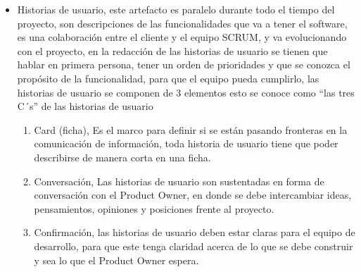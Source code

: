 \begin{itemize}
     \item Historias de usuario, este artefacto es paralelo durante todo el tiempo del proyecto, son descripciones de las funcionalidades que va a tener el software, es una colaboración entre el cliente y el equipo SCRUM, y va evolucionando con el proyecto, en la redacción de las historias de usuario se tienen que hablar en primera persona, tener un orden de prioridades y que se conozca el propósito de la funcionalidad, para que el equipo pueda cumplirlo, las historias de usuario se componen de 3 elementos esto se conoce como “las tres C´s” de las historias de usuario
	    \begin{enumerate}
	        \item Card (ficha), Es el marco para definir si se están pasando fronteras en la comunicación de información, toda historia de usuario tiene que poder describirse de manera corta en una ficha.
            \item Conversación, Las historias de usuario son sustentadas en forma de conversación con el Product Owner, en donde se debe intercambiar ideas, pensamientos, opiniones y posiciones frente al proyecto.
            \item Confirmación, las historias de usuario deben estar claras para el equipo de desarrollo, para que este tenga claridad acerca de lo que se debe construir y sea lo que el Product Owner espera.
    	 \end{enumerate}

 \end{itemize}